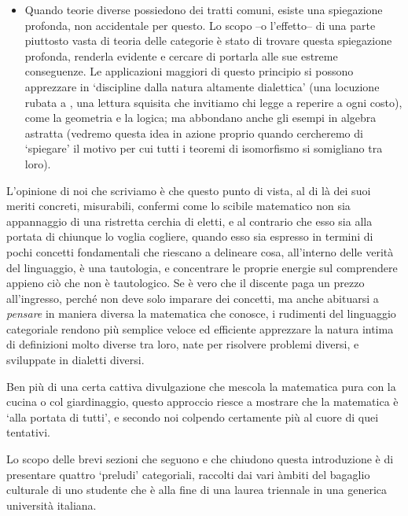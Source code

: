 \begin{itemize}
  \item Quando teorie diverse possiedono dei tratti comuni, esiste una spiegazione profonda, non accidentale per questo. Lo scopo --o l'effetto-- di una parte piuttosto vasta di teoria delle categorie è stato di trovare questa spiegazione profonda, renderla evidente e cercare di portarla alle sue estreme conseguenze. Le applicazioni maggiori di questo principio si possono apprezzare in `discipline dalla natura altamente dialettica' (una locuzione rubata a \cite{}, una lettura squisita che invitiamo chi legge a reperire a ogni costo), come la geometria e la logica; ma abbondano anche gli esempi in algebra astratta (vedremo questa idea in azione proprio quando cercheremo di `spiegare' il motivo per cui tutti i teoremi di isomorfismo si somigliano tra loro).
\end{itemize}
L'opinione di noi che scriviamo è che questo punto di vista, al di là dei suoi meriti concreti, misurabili, confermi come lo scibile matematico non sia appannaggio di una ristretta cerchia di eletti, e al contrario che esso sia alla portata di chiunque lo voglia cogliere, quando esso sia espresso in termini di pochi concetti fondamentali che riescano a delineare cosa, all'interno delle verità del linguaggio, è una tautologia, e concentrare le proprie energie sul comprendere appieno ciò che non è tautologico. Se è vero che il discente paga un prezzo all'ingresso, perché non deve solo imparare dei concetti, ma anche abituarsi a \emph{pensare} in maniera diversa la matematica che conosce, i rudimenti del linguaggio categoriale rendono più semplice veloce ed efficiente apprezzare la natura intima di definizioni molto diverse tra loro, nate per risolvere problemi diversi, e sviluppate in dialetti diversi.

Ben più di una certa cattiva divulgazione che mescola la matematica pura con la cucina o col giardinaggio, questo approccio riesce a mostrare che la matematica è `alla portata di tutti', e secondo noi colpendo certamente più al cuore di quei tentativi.

\medskip
Lo scopo delle brevi sezioni che seguono e che chiudono questa introduzione è di presentare quattro `preludi' categoriali, raccolti dai vari àmbiti del bagaglio culturale di uno studente che è alla fine di una laurea triennale in una generica università italiana.

